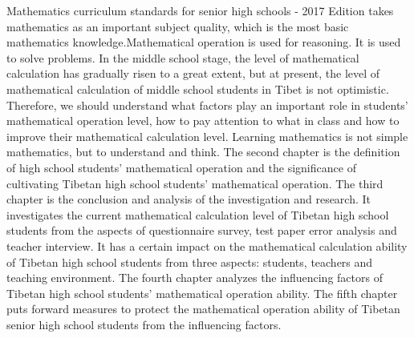 \documentclass{CCNUthesis}
\begin{document}
\begin{abstract*}
  Mathematics curriculum standards for senior high schools - 2017  Edition takes mathematics as an important subject quality, which is the most basic mathematics knowledge.Mathematical operation is used for reasoning. It is used to solve problems. In the middle school stage, the level of mathematical calculation has gradually risen to a great extent, but at present, the level of mathematical calculation of middle school students in Tibet is not optimistic. Therefore, we should understand what factors play an important role in students' mathematical operation level, how to pay attention to what in class and how to improve their mathematical calculation level. Learning mathematics is not simple mathematics, but to understand and think. The second chapter is the definition of high school students' mathematical operation and the significance of cultivating Tibetan high school students' mathematical operation. The third chapter is the conclusion and analysis of the investigation and research. It investigates the current mathematical calculation level of Tibetan high school students from the aspects of questionnaire survey, test paper error analysis and teacher interview. It has a certain impact on the mathematical calculation ability of Tibetan high school students from three aspects: students, teachers and teaching environment. The fourth chapter analyzes the influencing factors of Tibetan high school students' mathematical operation ability. The fifth chapter puts forward measures to protect the mathematical operation ability of Tibetan senior high school students from the influencing factors.
\end{abstract*}


\end{document}
